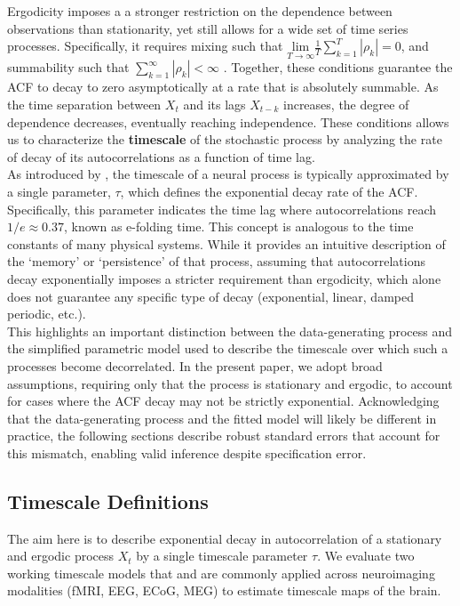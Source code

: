 \documentclass[main.tex]{subfiles}
\begin{document}
Ergodicity imposes a a stronger restriction on the dependence between observations than stationarity, yet still allows for a wide set of time series processes. Specifically, it requires mixing such that $\underset{T\to\infty}{\text{lim}} \frac{1}{T} \sum_{k=1}^T |\rho_k| = 0$, and summability such that $\sum_{k=1}^\infty |\rho_k| < \infty$ \citep[chapter~14.7]{hansen_econometrics_2022}. Together, these conditions guarantee the ACF to decay to zero asymptotically at a rate that is absolutely summable. As the time separation between $X_t$ and its lags $X_{t-k}$ increases, the degree of dependence decreases, eventually reaching independence. These conditions allows us to characterize the \textbf{timescale} of the stochastic process by analyzing the rate of decay of its autocorrelations as a function of time lag.\\

As introduced by \citet{murray_hierarchy_2014}, the timescale of a neural process is typically approximated by a single parameter, $\tau$, which defines the exponential decay rate of the ACF. Specifically, this parameter indicates the time lag where autocorrelations reach $1/e \approx 0.37$, known as e-folding time. This concept is analogous to the time constants of many physical systems. While it provides an intuitive description of the `memory' or `persistence' of that process, assuming that autocorrelations decay exponentially imposes a stricter requirement than ergodicity, which alone does not guarantee any specific type of decay (exponential, linear, damped periodic, etc.). \\

This highlights an important distinction between the data-generating process and the simplified parametric model used to describe the timescale over which such a processes become decorrelated. In the present paper, we adopt broad assumptions, requiring only that the process is stationary and ergodic, to account for cases where the ACF decay may not be strictly exponential. Acknowledging that the data-generating process and the fitted model will likely be different in practice, the following sections describe robust standard errors that account for this mismatch, enabling valid inference despite specification error.

\subsection{Timescale Definitions}
The aim here is to describe exponential decay in autocorrelation of a stationary and ergodic process $X_t$ by a single timescale parameter $\tau$. We evaluate two working timescale models that and are commonly applied across neuroimaging modalities (fMRI, EEG, ECoG, MEG) to estimate timescale maps of the brain. 
\end{document}
